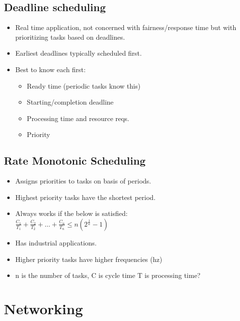 \documentclass[fontsize=5pt]{scrartcl}
\begin{document}
\begin{multicols}{3}
      \subsection{Deadline scheduling}
        \begin{itemize}
          \item Real time application, not concerned with fairness/response time but with prioritizing tasks based on deadlines.
          \item Earliest deadlines typically scheduled first.
          \item Best to know each first:
          \begin{itemize}
            \item Ready time (periodic tasks know this)
            \item Starting/completion deadline
            \item Processing time and resource reqs.
            \item Priority
           \end{itemize}
        \end{itemize}
      \subsection{Rate Monotonic Scheduling}
        \begin{itemize}
          \item Assigns priorities to tasks on basis of periods.
          \item Highest priority tasks have the shortest period.
          \item Always works if the below is satisfied:\\
          $\frac{C_1}{T_1} + \frac{C_2}{T_2} + \dots + \frac{C_n}{T_n} \le n(2^{\frac{1}{n}}-1)$
          \item Has industrial applications.
          \item Higher priority tasks have higher frequencies (hz)
          \item n is the number of tasks, C is cycle time T is processing time?
        \end{itemize}
  \section{Networking}

\end{multicols}
\end{document}
